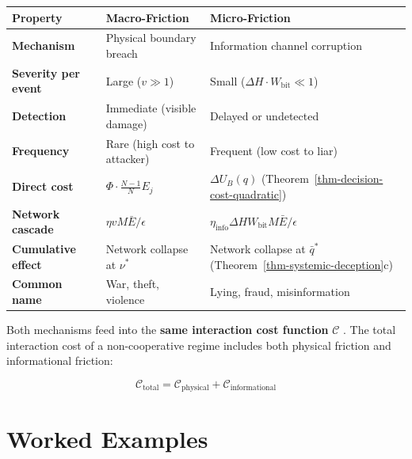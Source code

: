 \documentclass[11pt]{article}
\theoremstyle{plain}
\theoremstyle{definition}
\theoremstyle{remark}
\newcounter{none}
\let\origsection\section
\renewcommand{\section}{\needspace{12\baselineskip}\origsection}
\begin{document}
{\def\LTcaptype{none} %
\begin{longtable}[]{@{}
  >{\raggedright\arraybackslash}p{}
  >{\raggedright\arraybackslash}p{}
  >{\raggedright\arraybackslash}p{}@{}}
\toprule\noalign{}
\begin{minipage}[b]{\linewidth}\raggedright
Property
\end{minipage} & \begin{minipage}[b]{\linewidth}\raggedright
Macro-Friction
\end{minipage} & \begin{minipage}[b]{\linewidth}\raggedright
Micro-Friction
\end{minipage} \\
\midrule\noalign{}
\endhead
\bottomrule\noalign{}
\endlastfoot
\textbf{Mechanism} & Physical boundary breach & Information channel
corruption \\
\textbf{Severity per event} & Large (\(v \gg 1\)) & Small
(\(\Delta H \cdot W_{\text{bit}} \ll 1\)) \\
\textbf{Detection} & Immediate (visible damage) & Delayed or
undetected \\
\textbf{Frequency} & Rare (high cost to attacker) & Frequent (low cost
to liar) \\
\textbf{Direct cost} & \(\Phi \cdot \frac{N-1}{N} E_j\) \citep{TC-IV} &
\(\Delta U_B(q)\) (Theorem~\ref{thm-decision-cost-quadratic}) \\
\textbf{Network cascade} & \(\eta v M \bar{E} / \epsilon\) \citep{TC-IV}
& \(\eta_{\text{info}} \Delta H W_{\text{bit}} M \bar{E} / \epsilon\) \\
\textbf{Cumulative effect} & Network collapse at \(\nu^*\) \citep{TC-IV}
& Network collapse at \(\bar{q}^*\)
(Theorem~\ref{thm-systemic-deception}c) \\
\textbf{Common name} & War, theft, violence & Lying, fraud,
misinformation \\
\end{longtable}
}

Both mechanisms feed into the \textbf{same interaction cost function}
\(\mathcal{C}\) \citep{TC-IV}. The total interaction cost of a
non-cooperative regime includes both physical friction and informational
friction:

\[\mathcal{C}_{\text{total}} = \mathcal{C}_{\text{physical}} + \mathcal{C}_{\text{informational}}\]

\section{Worked Examples}\label{worked-examples}
\end{document}
